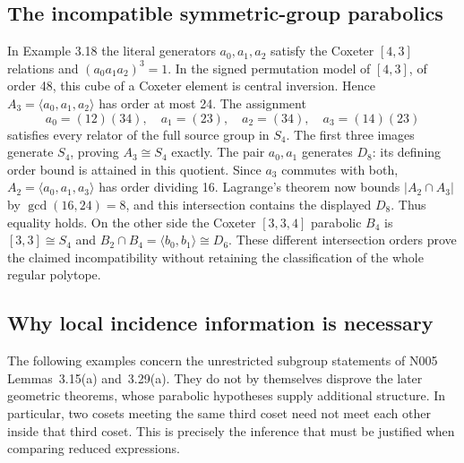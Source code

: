 \subsection{The incompatible symmetric-group parabolics}
In Example 3.18 the literal generators $a_0,a_1,a_2$ satisfy the
Coxeter $[4,3]$ relations and $(a_0a_1a_2)^3=1$. In the signed
permutation model of $[4,3]$, of order 48, this cube of a Coxeter
element is central inversion. Hence $A_3=\langle a_0,a_1,a_2\rangle$
has order at most 24. The assignment
\[
 a_0=(12)(34),\quad a_1=(23),\quad a_2=(34),\quad a_3=(14)(23)
\]
satisfies every relator of the full source group in $S_4$. The first
three images generate $S_4$, proving $A_3\cong S_4$ exactly.
The pair $a_0,a_1$ generates $D_8$: its defining order bound is
attained in this quotient. Since $a_3$ commutes with both,
$A_2=\langle a_0,a_1,a_3\rangle$ has order dividing 16.
Lagrange's theorem now bounds $|A_2\cap A_3|$ by
$\gcd(16,24)=8$, and this intersection contains the displayed
$D_8$. Thus equality holds. On the other side the Coxeter $[3,3,4]$
parabolic $B_4$ is $[3,3]\cong S_4$ and
$B_2\cap B_4=\langle b_0,b_1\rangle\cong D_6$.
These different intersection orders prove the claimed incompatibility
without retaining the classification of the whole regular polytope.


\subsection{Why local incidence information is necessary}


The following examples concern the unrestricted subgroup statements of
N005 Lemmas~3.15(a) and~3.29(a). They do not by themselves disprove
the later geometric theorems, whose parabolic hypotheses supply additional
structure. In particular, two cosets meeting the same third coset need not
meet each other inside that third coset. This is precisely the inference
that must be justified when comparing reduced expressions.

